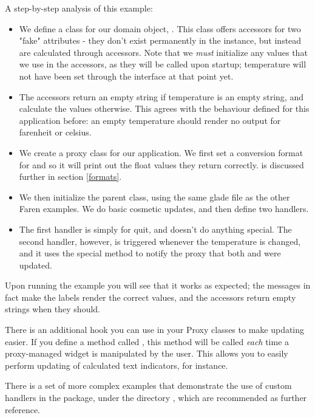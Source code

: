 \documentclass[a4paper]{howto}
\begin{document}
A step-by-step analysis of this example:

\begin{itemize}
\item We define a class for our domain object, . This
class offers accessors for two "fake" attributes - they don't exist
permanently in the instance, but instead are calculated through
accessors. Note that we {\it must} initialize any values that we use in
the accessors, as they will be called upon startup; temperature will not
have been set through the interface at that point yet.

\item The accessors return an empty string if temperature is an empty
string, and calculate the values otherwise. This agrees with the
behaviour defined for this application before: an empty temperature
should render no output for farenheit or celsius.

\item We create a proxy class for our application.  We first set a
conversion format for  and  so it will
print out the float values they return correctly. 
is discussed further in section \ref{formats}.

\item We then initialize the parent class, using the same glade file as
the other Faren examples. We do basic cosmetic updates, and then define
two handlers.

\item The first handler is simply for quit, and doesn't do anything
special. The second handler, however, is triggered whenever the
temperature is changed, and it uses the special  method
to notify the proxy that both  and  were
updated.

\end{itemize}

Upon running the example you will see that it works as expected;
the  messages in fact make the labels render the correct
values, and the accessors return empty strings when they should.

There is an additional hook you can use in your Proxy classes to make
updating easier. If you define a method called ,
this method will be called {\it each} time a proxy-managed widget is
manipulated by the user. This allows you to easily perform updating of
calculated text indicators, for instance.

There is a set of more complex examples that demonstrate the use of
custom handlers in the package, under the directory
, which are recommended as further reference.
\end{document}
